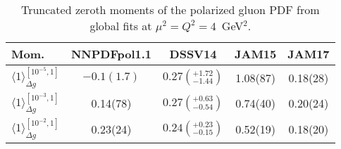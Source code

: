 \begin{table}[!t]
\centering
\footnotesize
\begin{tabular}{lcccc}
\toprule
Mom. & NNPDFpol1.1 & DSSV14 & JAM15 & JAM17\\
\midrule
$\langle 1\rangle_{\Delta g}^{[10^{-5},1]}$  
& $-0.1(1.7)$ & $0.27(^{+1.72}_{-1.44})$  & 1.08(87) & 0.18(28)\\
$\langle 1\rangle_{\Delta g}^{[10^{-3},1]}$  
& 0.14(78)  & $0.27(^{+0.63}_{-0.54})$  & 0.74(40) & 0.20(24)\\
$\langle 1\rangle_{\Delta g}^{[10^{-2},1]}$  
& 0.23(24)  & $0.24(^{+0.23}_{-0.15})$  & 0.52(19) & 0.18(20)\\
\bottomrule
\end{tabular}
\caption{\small Truncated zeroth moments of the polarized gluon PDF from 
global fits at $\mu^2=Q^2=4$~GeV$^2$.}
\label{tab:polgmom}
\end{table}
